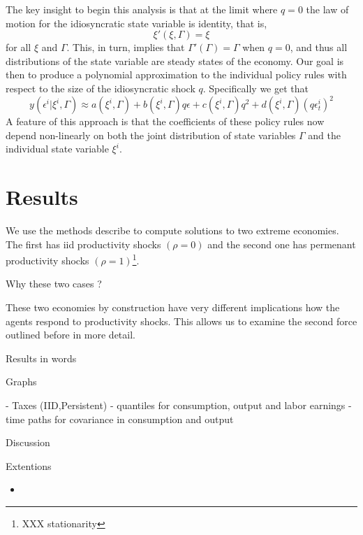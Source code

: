 \documentclass[thmsb,11pt]{article}
\begin{document}
The key insight to begin this analysis is that at the limit where $q = 0$ the law of motion for the idiosyncratic state variable is identity, that is,
\[
	\xi'(\xi,\Gamma) = \xi 
\] for all $\xi$ and $\Gamma$.  This, in turn, implies that $\Gamma'(\Gamma) = \Gamma$ when $q=0$, and thus all distributions of the state variable are steady states of the economy.  Our goal is then to produce a polynomial approximation to the individual policy rules with respect to the size of the idiosyncratic shock $q$.  Specifically we get that 
\[
	y(\epsilon^i | \xi^i,\Gamma) \approx a(\xi^i,\Gamma) + b(\xi^i,\Gamma) q\epsilon + c(\xi^i,\Gamma) q^2 + d(\xi^i,\Gamma)(q\epsilon^i_t)^2
\]A feature of this approach is that the coefficients of these policy rules now depend non-linearly on both the joint distribution of state variables $\Gamma$ and the individual state variable $\xi^i$.

  \section{Results}
We use the methods describe to compute solutions to two extreme economies. The first has iid productivity shocks $(\rho=0)$ and the second one has permenant productivity shocks $(\rho=1)$\footnote{XXX stationarity}.

Why these two cases ?



  These two economies by construction have very different implications how the agents respond to productivity shocks. This allows us to examine the second force outlined before in more detail.

Results in words


Graphs

- Taxes (IID,Persistent)
- quantiles for consumption, output and labor earnings
- time paths for covariance in consumption and output




Discussion



Extentions









  \begin{itemize}
  \item 
  \end{itemize}
\end{document}
